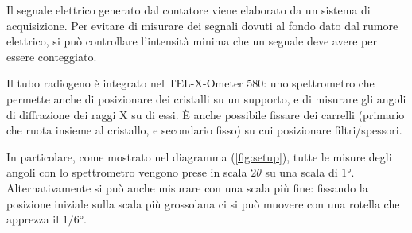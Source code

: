 Il segnale elettrico generato dal contatore viene elaborato da un sistema di acquisizione.
Per evitare di misurare dei segnali dovuti al fondo dato dal rumore elettrico, si può controllare l'intensità minima che un segnale deve avere per essere conteggiato.

Il tubo radiogeno è integrato nel TEL-X-Ometer 580: uno spettrometro che permette anche di posizionare dei cristalli su un supporto, e di misurare gli angoli di diffrazione dei raggi X su di essi.
È anche possibile fissare dei carrelli (primario che ruota insieme al cristallo, e secondario fisso) su cui posizionare filtri/spessori.

In particolare, come mostrato nel diagramma (\ref{fig:setup}), tutte le misure degli angoli con lo spettrometro vengono prese in scala $ 2\theta $ su una scala di $ 1 \unit{\degree} $.
Alternativamente si può anche misurare con una scala più fine: fissando la posizione iniziale sulla scala più grossolana ci si può muovere con una rotella che apprezza il $ 1/6 \unit{\degree} $.
